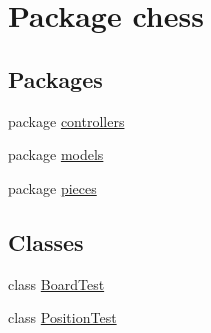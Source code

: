 \hypertarget{namespacechess}{}\section{Package chess}
\label{namespacechess}
\subsection*{Packages}
\begin{DoxyCompactItemize}
\item 
package \mbox{\hyperlink{namespacechess_1_1controllers}{controllers}}
\item 
package \mbox{\hyperlink{namespacechess_1_1models}{models}}
\item 
package \mbox{\hyperlink{namespacechess_1_1pieces}{pieces}}
\end{DoxyCompactItemize}
\subsection*{Classes}
\begin{DoxyCompactItemize}
\item 
class \mbox{\hyperlink{classchess_1_1_board_test}{Board\+Test}}
\item 
class \mbox{\hyperlink{classchess_1_1_position_test}{Position\+Test}}
\end{DoxyCompactItemize}
